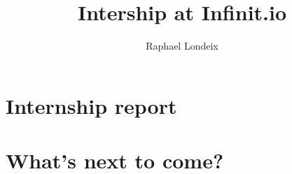 \documentclass[a4paper,11pt]{article}
\title{Intership at Infinit.io}
\author{Raphael Londeix}
\begin{document}
	\section{Internship report}

	\section{What's next to come?}

	\section{}
\end{document}
